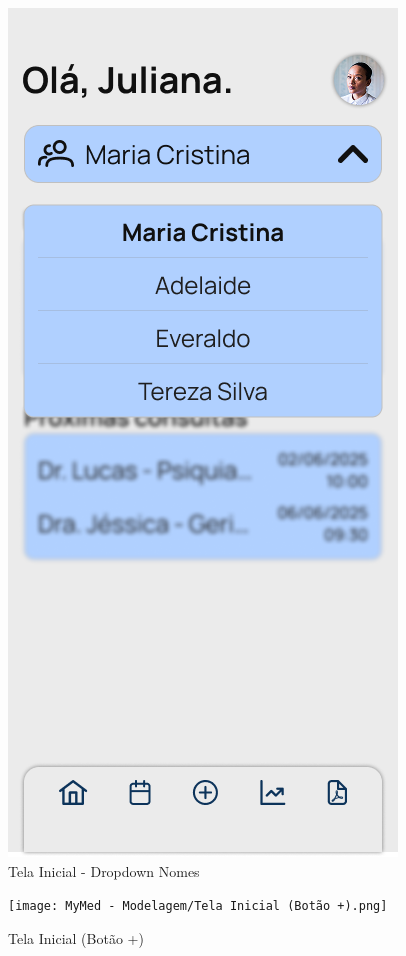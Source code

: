 \begin{figure}
	\centering
	\includegraphics[width=0.6\linewidth]{MyMed - Modelagem/Tela Inicial - Dropdown Nomes.png}
	\caption{Tela Inicial - Dropdown Nomes}
	\label{tela_inicial_dropdown_nomes}
\end{figure}

\begin{figure}
	\centering
	\texttt{[image: MyMed - Modelagem/Tela Inicial (Botão +).png]}
	\caption{Tela Inicial (Botão +)}
	\label{tela_inicial_botao_mais}
\end{figure}

